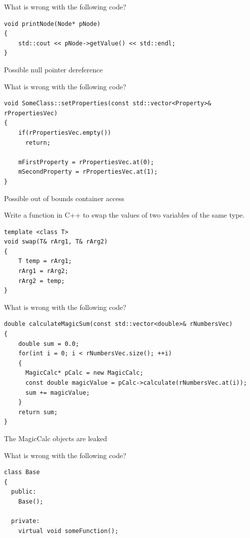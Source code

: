 \documentclass[answers]{exam}
\begin{document}
\begin{questions}
\question What is wrong with the following code?
\begin{lstlisting}
void printNode(Node* pNode)
{
    std::cout << pNode->getValue() << std::endl;
}
\end{lstlisting}
\begin{solution}[.2in]
Possible null pointer dereference
\end{solution}

\question What is wrong with the following code?
\begin{lstlisting}
void SomeClass::setProperties(const std::vector<Property>& rPropertiesVec)
{
    if(rPropertiesVec.empty())
      return;

    mFirstProperty = rPropertiesVec.at(0);
    mSecondProperty = rPropertiesVec.at(1);
}
\end{lstlisting}
\begin{solution}[.2in]
Possible out of bounds container access
\end{solution}

\question Write a function in C++ to swap the values of two variables of the same type.
\begin{solution}[.2in]
\begin{lstlisting}
template <class T>
void swap(T& rArg1, T& rArg2)
{
    T temp = rArg1;
    rArg1 = rArg2;
    rArg2 = temp;
}
\end{lstlisting}
\end{solution}

\question What is wrong with the following code?
\begin{lstlisting}
double calculateMagicSum(const std::vector<double>& rNumbersVec)
{
    double sum = 0.0;
    for(int i = 0; i < rNumbersVec.size(); ++i)
    {
      MagicCalc* pCalc = new MagicCalc;
      const double magicValue = pCalc->calculate(rNumbersVec.at(i));
      sum += magicValue;
    }
    return sum;
}
\end{lstlisting}
\begin{solution}[.2in]
The MagicCalc objects are leaked
\end{solution}

\question What is wrong with the following code?
\begin{lstlisting}
class Base
{
  public:
    Base();

  private:
    virtual void someFunction();


\end{lstlisting}
\end{questions}
\end{document}
